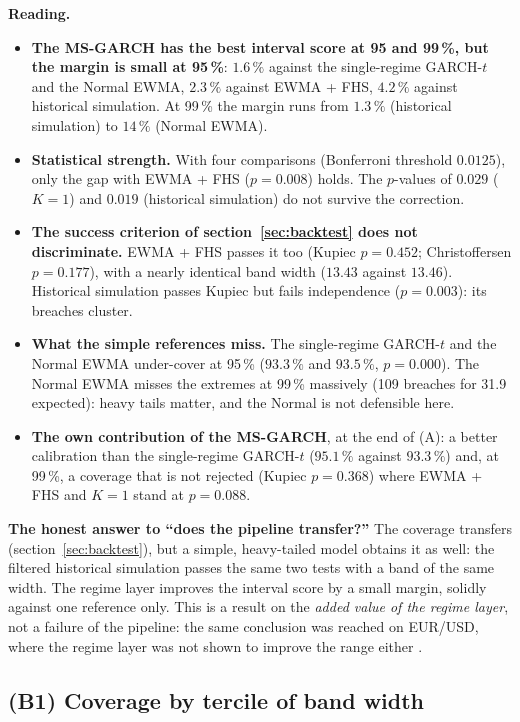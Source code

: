 \documentclass[12pt,a4paper]{article}
\begin{document}
\textbf{Reading.}
\begin{itemize}
	\item \textbf{The MS-GARCH has the best interval score at 95 and 99\,\%, but the margin is small at 95\,\%}: $1.6\,\%$ against the single-regime GARCH-$t$ and the Normal EWMA, $2.3\,\%$ against EWMA + FHS, $4.2\,\%$ against historical simulation. At 99\,\% the margin runs from $1.3\,\%$ (historical simulation) to $14\,\%$ (Normal EWMA).
	\item \textbf{Statistical strength.} With four comparisons (Bonferroni threshold $0.0125$), only the gap with EWMA + FHS ($p=0.008$) holds. The $p$-values of $0.029$ ($K=1$) and $0.019$ (historical simulation) do not survive the correction.
	\item \textbf{The success criterion of section~\ref{sec:backtest} does not discriminate.} EWMA + FHS passes it too (Kupiec $p=0.452$; Christoffersen $p=0.177$), with a nearly identical band width ($13.43$ against $13.46$). Historical simulation passes Kupiec but fails independence ($p=0.003$): its breaches cluster.
	\item \textbf{What the simple references miss.} The single-regime GARCH-$t$ and the Normal EWMA under-cover at 95\,\% ($93.3\,\%$ and $93.5\,\%$, $p=0.000$). The Normal EWMA misses the extremes at 99\,\% massively (109 breaches for 31.9 expected): heavy tails matter, and the Normal is not defensible here.
	\item \textbf{The own contribution of the MS-GARCH}, at the end of (A): a better calibration than the single-regime GARCH-$t$ ($95.1\,\%$ against $93.3\,\%$) and, at 99\,\%, a coverage that is not rejected (Kupiec $p=0.368$) where EWMA + FHS and $K=1$ stand at $p=0.088$.
\end{itemize}

\begin{limitbox}
	\textbf{The honest answer to ``does the pipeline transfer?''} The coverage transfers (section~\ref{sec:backtest}), but a simple, heavy-tailed model obtains it as well: the filtered historical simulation passes the same two tests with a band of the same width. The regime layer improves the interval score by a small margin, solidly against one reference only. This is a result on the \emph{added value of the regime layer}, not a failure of the pipeline: the same conclusion was reached on EUR/USD, where the regime layer was not shown to improve the range either \citep{ZEWU2026fx}.
\end{limitbox}

\subsection{(B1) Coverage by tercile of band width}
\end{document}
